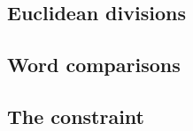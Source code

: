 \subsection{Euclidean divisions}                               
\subsection{Word comparisons}                                  
\subsection{The \stdProgression{} constraint}   
